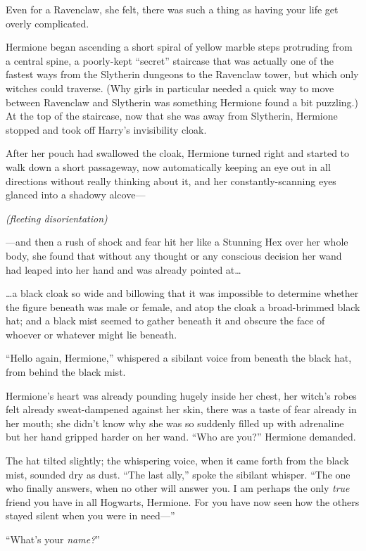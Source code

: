Even for a Ravenclaw, she felt, there was such a thing as having your life get overly complicated.

Hermione began ascending a short spiral of yellow marble steps protruding from a central spine, a poorly-kept “secret” staircase that was actually one of the fastest ways from the Slytherin dungeons to the Ravenclaw tower, but which only witches could traverse. (Why girls in particular needed a quick way to move between Ravenclaw and Slytherin was something Hermione found a bit puzzling.) At the top of the staircase, now that she was away from Slytherin, Hermione stopped and took off Harry’s invisibility cloak.

After her pouch had swallowed the cloak, Hermione turned right and started to walk down a short passageway, now automatically keeping an eye out in all directions without really thinking about it, and her constantly-scanning eyes glanced into a shadowy alcove—

\emph{(fleeting disorientation)}

—and then a rush of shock and fear hit her like a Stunning Hex over her whole body, she found that without any thought or any conscious decision her wand had leaped into her hand and was already pointed at…

…a black cloak so wide and billowing that it was impossible to determine whether the figure beneath was male or female, and atop the cloak a broad-brimmed black hat; and a black mist seemed to gather beneath it and obscure the face of whoever or whatever might lie beneath.

“Hello again, Hermione,” whispered a sibilant voice from beneath the black hat, from behind the black mist.

Hermione’s heart was already pounding hugely inside her chest, her witch’s robes felt already sweat-dampened against her skin, there was a taste of fear already in her mouth; she didn’t know why she was so suddenly filled up with adrenaline but her hand gripped harder on her wand. “Who are you?” Hermione demanded.

The hat tilted slightly; the whispering voice, when it came forth from the black mist, sounded dry as dust. “The last ally,” spoke the sibilant whisper. “The one who finally answers, when no other will answer you. I am perhaps the only \emph{true} friend you have in all Hogwarts, Hermione. For you have now seen how the others stayed silent when you were in need—”

“What’s your \emph{name?}”

